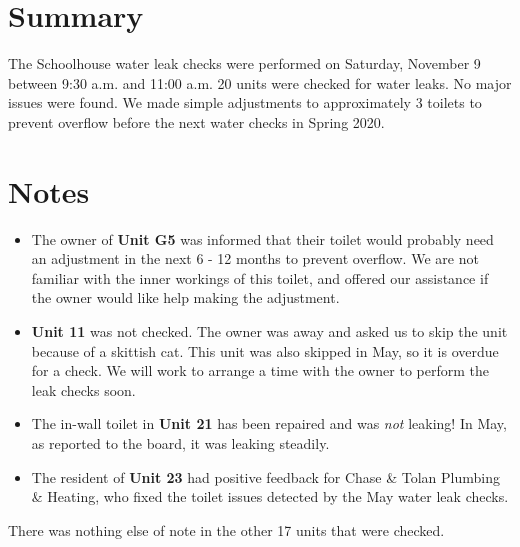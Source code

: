 \documentclass[letterpaper,10pt]{texMemo}
\begin{document}
\maketitle

\section*{Summary}

The Schoolhouse water leak checks were performed on Saturday, November
9 between 9:30 a.m. and 11:00 a.m. 20 units were checked for water
leaks. No major issues were found. We made simple adjustments to
approximately 3 toilets to prevent overflow before the next water
checks in Spring 2020.

\section*{Notes}

\begin{itemize}

\item The owner of \textbf{Unit G5} was informed that their toilet
  would probably need an adjustment in the next 6 - 12 months to
  prevent overflow. We are not familiar with the inner workings of
  this toilet, and offered our assistance if the owner would like help
  making the adjustment.

\item \textbf{Unit 11} was not checked. The owner was away and asked
  us to skip the unit because of a skittish cat. This unit was also
  skipped in May, so it is overdue for a check. We will work to
  arrange a time with the owner to perform the leak checks soon.

\item The in-wall toilet in \textbf{Unit 21} has been repaired and was
  \emph{not} leaking! In May, as reported to the board, it was leaking
  steadily.

\item The resident of \textbf{Unit 23} had positive feedback for Chase
  \& Tolan Plumbing \& Heating, who fixed the toilet issues detected
  by the May water leak checks.

\end{itemize}

There was nothing else of note in the other 17 units that were
checked.
\end{document}
